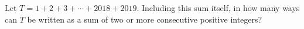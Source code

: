 Let $T=1+2+3+\cdots+2018+2019$. Including this sum itself, in how many ways can $T$ be written as a sum of two or more consecutive positive integers?

